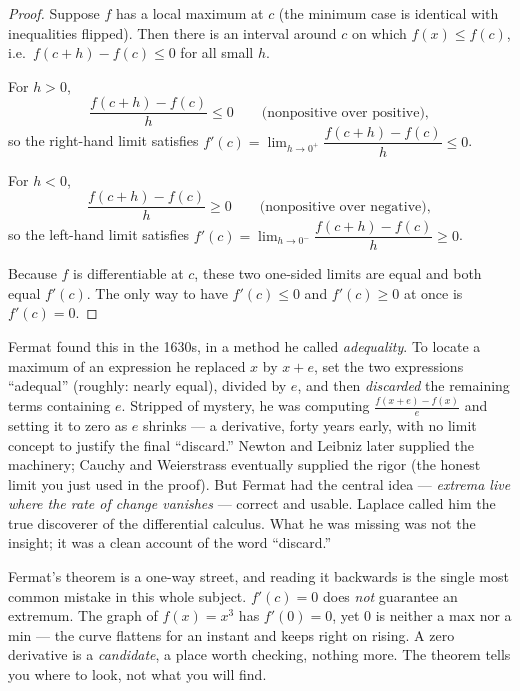\begin{proof}
Suppose $f$ has a local maximum at $c$ (the minimum case is identical with
inequalities flipped). Then there is an interval around $c$ on which
$f(x)\le f(c)$, i.e.\ $f(c+h)-f(c)\le 0$ for all small $h$.

For $h>0$,
\[
\frac{f(c+h)-f(c)}{h} \le 0
\qquad\text{(nonpositive over positive)},
\]
so the right-hand limit satisfies $f'(c)=\lim_{h\to 0^+}\dfrac{f(c+h)-f(c)}{h}\le
0$.

For $h<0$,
\[
\frac{f(c+h)-f(c)}{h} \ge 0
\qquad\text{(nonpositive over negative)},
\]
so the left-hand limit satisfies $f'(c)=\lim_{h\to 0^-}\dfrac{f(c+h)-f(c)}{h}\ge
0$.

Because $f$ is differentiable at $c$, these two one-sided limits are equal and both
equal $f'(c)$. The only way to have $f'(c)\le 0$ and $f'(c)\ge 0$ at once is
$f'(c)=0$.
\end{proof}

\begin{historybox}
Fermat found this in the 1630s, in a method he called \emph{adequality}. To locate
a maximum of an expression he replaced $x$ by $x+e$, set the two expressions
``adequal'' (roughly: nearly equal), divided by $e$, and then \emph{discarded} the
remaining terms containing $e$. Stripped of mystery, he was computing
$\frac{f(x+e)-f(x)}{e}$ and setting it to zero as $e$ shrinks --- a derivative,
forty years early, with no limit concept to justify the final ``discard.'' Newton
and Leibniz later supplied the machinery; Cauchy and Weierstrass eventually
supplied the rigor (the honest limit you just used in the proof). But Fermat had
the central idea --- \emph{extrema live where the rate of change vanishes} ---
correct and usable. Laplace called him the true discoverer of the differential
calculus. What he was missing was not the insight; it was a clean account of the
word ``discard.''
\end{historybox}

\begin{trapbox}
Fermat's theorem is a one-way street, and reading it backwards is the single most
common mistake in this whole subject. $f'(c)=0$ does \emph{not} guarantee an
extremum. The graph of $f(x)=x^3$ has $f'(0)=0$, yet $0$ is neither a max nor a
min --- the curve flattens for an instant and keeps right on rising. A zero
derivative is a \emph{candidate}, a place worth checking, nothing more. The
theorem tells you where to look, not what you will find.
\end{trapbox}

